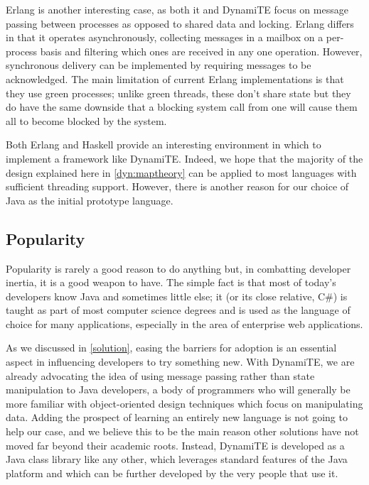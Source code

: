 Erlang \cite{erlang} is another interesting case, as both it and
DynamiTE focus on message passing between processes as opposed to
shared data and locking.  Erlang differs in that it operates
asynchronously, collecting messages in a mailbox on a per-process
basis and filtering which ones are received in any one operation.
However, synchronous delivery can be implemented by requiring messages
to be acknowledged.  The main limitation of current Erlang
implementations is that they use green processes; unlike green
threads, these don't share state but they do have the same downside
that a blocking system call from one will cause them all to become
blocked by the system.

Both Erlang and Haskell provide an interesting environment in which to
implement a framework like DynamiTE.  Indeed, we hope that the
majority of the design explained here in \ref{dyn:maptheory} can be
applied to most languages with sufficient threading support.  However,
there is another reason for our choice of Java as the initial
prototype language.

\subsection{Popularity}

Popularity is rarely a good reason to do anything but, in combatting
developer inertia, it is a good weapon to have.  The simple fact is
that most of today's developers know Java and sometimes little else;
it (or its close relative, C\#) is taught as part of most computer
science degrees and is used as the language of choice for many
applications, especially in the area of enterprise web applications.

As we discussed in \ref{solution}, easing the barriers for adoption is
an essential aspect in influencing developers to try something new.
With DynamiTE, we are already advocating the idea of using message
passing rather than state manipulation to Java developers, a body of
programmers who will generally be more familiar with object-oriented
design techniques which focus on manipulating data.  Adding the
prospect of learning an entirely new language is not going to help our
case, and we believe this to be the main reason other solutions have
not moved far beyond their academic roots.  Instead, DynamiTE is
developed as a Java class library like any other, which leverages
standard features of the Java platform and which can be further
developed by the very people that use it.

